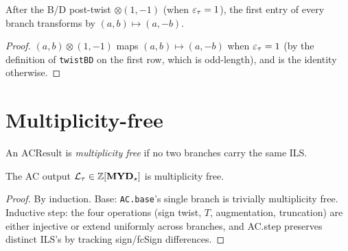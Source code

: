 \begin{theorem}
  \label{thm:postTwist_first_entry}
  \leanok
  After the B/D post-twist $\otimes(1, -1)$ (when $\varepsilon_\tau = 1$), the first entry of every branch transforms by $(a, b) \mapsto (a, -b)$.
\end{theorem}
\begin{proof}
  \leanok
  $(a, b) \otimes (1, -1)$ maps $(a, b) \mapsto (a, -b)$ when $\varepsilon_\tau = 1$ (by the definition of \texttt{twistBD} on the first row, which is odd-length), and is the identity otherwise.
\end{proof}


\section{Multiplicity-free}

\begin{definition}[MultiplicityFree]
  \label{def:mfree}
  \leanok
  An $\mathrm{ACResult}$ is \emph{multiplicity free} if no two branches carry the same ILS.
\end{definition}

\begin{proposition}
  \label{prop:11_7}
  \leanok
  The AC output $\mathcal{L}_\tau \in \mathbb{Z}[\mathbf{MYD}_\star]$ is multiplicity free.
\end{proposition}
\begin{proof}
  \leanok
  By induction. Base: \texttt{AC.base}'s single branch is trivially multiplicity free.
  Inductive step: the four operations (sign twist, $T$, augmentation, truncation) are either injective or extend uniformly across branches, and AC.step preserves distinct ILS's by tracking sign/fcSign differences.
\end{proof}
